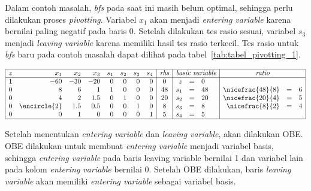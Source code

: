 Dalam contoh masalah, \textit{bfs} pada saat ini masih belum optimal, sehingga perlu dilakukan proses \textit{pivotting}. Variabel \(x_1\) akan menjadi \textit{entering variable} karena bernilai paling negatif pada baris 0. Setelah dilakukan tes rasio sesuai, variabel \(s_3\) menjadi \textit{leaving variable} karena memiliki hasil tes rasio terkecil. Tes rasio untuk \textit{bfs} baru pada contoh masalah dapat dilihat pada tabel~\ref{tab:tabel_pivotting_1}.

\begin{center}
	\label{tab:tabel_pivotting_1}
	$
	\begin{array}{|r r r r r r r r|c|r c l|r c l|}
		\hline
		z & x_1 & x_2 & x_3 & s_1 & s_2 & s_3 & s_4 & \textit{rhs} & \multicolumn{3}{c|}{\textit{basic variable}} & \multicolumn{3}{c|}{\textit{ratio}}\\
		\hline
		1 & -60 & -30 & -20 & 0 & 0 & 0 & 0 & 0 & z & = & 0 &&&\\
		0 & 8 & 6 & 1 & 1 & 0 & 0 & 0 & 48 & s_1 & = & 48 & \nicefrac{48}{8} & = & 6\\
		0 & 4 & 2 & 1.5 & 0 & 1 & 0 & 0 & 20 & s_2 & = & 20 & \nicefrac{20}{4} & = & 5\\
		0 & \encircle{2} & 1.5 & 0.5 & 0 & 0 & 1 & 0 & 8 & s_3 & = & 8 & \nicefrac{8}{2} & = & 4\\
		0 & 0 & 1 & 0 & 0 & 0 & 0 & 1 & 5 & s_4 & = & 5 &&&\\
		\hline
	\end{array}
	$
\end{center}

Setelah menentukan \textit{entering variable} dan \textit{leaving variable}, akan dilakukan OBE. OBE dilakukan untuk membuat \textit{entering variable} menjadi variabel basis, sehingga \textit{entering variable} pada baris {leaving variable} bernilai 1 dan variabel lain pada kolom \textit{entering variable} bernilai 0. Setelah OBE dilakukan, baris \textit{leaving variable} akan memiliki \textit{entering variable} sebagai variabel basis.

